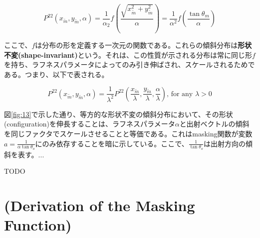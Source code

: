 \documentclass[a4j,xelatex,ja=standard]{bxjsarticle}
\begin{document}
\begin{equation}
    P^{22}(x_{\tilde{m}}, y_{\tilde{m}}, \alpha) = \frac{1}{\alpha_2} f \left( \frac{\sqrt{x_{\tilde{m}}^2 + y_{\tilde{m}}^2}}{\alpha} \right) = \frac{1}{\alpha^2} f \left( \frac{\tan\theta_m}{\alpha} \right)
    \label{eq:65}
\end{equation}

ここで、$f$は分布の形を定義する一次元の関数である。これらの傾斜分布は\textbf{形状不変(shape-invariant)}という。それは、この性質が示される分布は常に同じ形$f$を持ち、ラフネスパラメータによってのみ引き伸ばされ、スケールされるためである。つまり、以下で表される。

\begin{equation}
    P^{22}(x_{\tilde{m}}, y_{\tilde{m}}, \alpha) = \frac{1}{\lambda^2} P^{22}(\frac{x_{\tilde{m}}}{\lambda}, \frac{y_{\tilde{m}}}{\lambda}, \frac{\alpha}{\lambda}) \text{, for any } \lambda > 0
    \label{eq:66}
\end{equation}

図\ref{fig:13}で示した通り、等方的な形状不変の傾斜分布において、その形状(configuration)を伸長することは、ラフネスパラメータ$\alpha$と出射ベクトルの傾斜を同じファクタでスケールさせることと等価である。これはmasking関数が変数$a = \frac{1}{\alpha\tan\theta_o}$にのみ依存することを暗に示している。ここで、$\frac{1}{\tan\theta_o}$は出射方向の傾斜を表す。...

TODO

\appendix

\section{(Derivation of the Masking Function)}
\label{sec:A}
\end{document}
